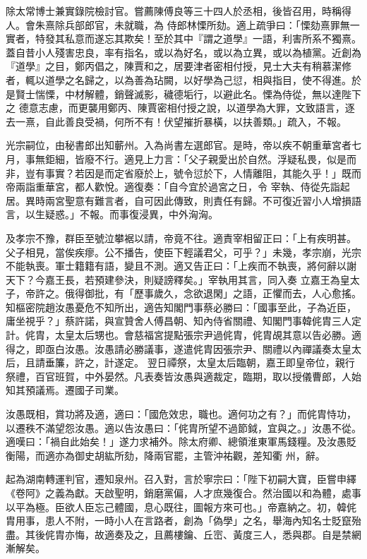 \begin{pinyinscope}
 除太常博士兼實錄院檢討官。嘗薦陳傅良等三十四人於丞相，後皆召用，時稱得人。會朱熹除兵部郎官，未就職，為
 侍郎林慄所劾。適上疏爭曰：「慄劾熹罪無一實者，特發其私意而遂忘其欺矣！至於其中『謂之道學』一語，利害所系不獨熹。蓋自昔小人殘害忠良，率有指名，或以為好名，或以為立異，或以為植黨。近創為『道學』之目，鄭丙倡之，陳賈和之，居要津者密相付授，見士大夫有稍慕潔修者，輒以道學之名歸之，以為善為玷闕，以好學為己愆，相與指目，使不得進。於是賢士惴慄，中材解體，銷聲滅影，穢德垢行，以避此名。慄為侍從，無以達陛下之
 德意志慮，而更襲用鄭丙、陳賈密相付授之說，以道學為大罪，文致語言，逐去一熹，自此善良受禍，何所不有！伏望摧折暴橫，以扶善類。」疏入，不報。



 光宗嗣位，由秘書郎出知蘄州。入為尚書左選郎官。是時，帝以疾不朝重華宮者七月，事無鉅細，皆廢不行。適見上力言：「父子親愛出於自然。浮疑私畏，似是而非，豈有事實？若因是而定省廢於上，號令愆於下，人情離阻，其能久乎！」既而帝兩詣重華宮，都人歡悅。適復奏：「自今宜於過宮之日，令
 宰執、侍從先詣起居。異時兩宮聖意有難言者，自可因此傳致，則責任有歸。不可復近習小人增損語言，以生疑惑。」不報。而事復浸異，中外洶洶。



 及孝宗不豫，群臣至號泣攀裾以請，帝竟不往。適責宰相留正曰：「上有疾明甚。父子相見，當俟疾瘳。公不播告，使臣下輕議君父，可乎？」未幾，孝宗崩，光宗不能執喪。軍士籍籍有語，變且不測。適又告正曰：「上疾而不執喪，將何辭以謝天下？今嘉王長，若預建參決，則疑謗釋矣。」宰執用其言，同入奏
 立嘉王為皇太子，帝許之。俄得御批，有「歷事歲久，念欲退閑」之語，正懼而去，人心愈搖。知樞密院趙汝愚憂危不知所出，適告知閣門事蔡必勝曰：「國事至此，子為近臣，庸坐視乎？」蔡許諾，與宣贊舍人傅昌朝、知內侍省關禮、知閣門事韓侂胄三人定計。侂胄，太皇太后甥也。會慈福宮提點張宗尹過侂胄，侂胄覘其意以告必勝。適得之，即亟白汝愚。汝愚請必勝議事，遂遣侂胄因張宗尹、關禮以內禪議奏太皇太后，且請垂簾，許之，計遂定。
 翌日禫祭，太皇太后臨朝，嘉王即皇帝位，親行祭禮，百官班賀，中外晏然。凡表奏皆汝愚與適裁定，臨期，取以授儀曹郎，人始知其預議焉。遷國子司業。



 汝愚既相，賞功將及適，適曰：「國危效忠，職也。適何功之有？」而侂胄恃功，以遷秩不滿望怨汝愚。適以告汝愚曰：「侂胄所望不過節鉞，宜與之。」汝愚不從。適嘆曰：「禍自此始矣！」遂力求補外。除太府卿、總領淮東軍馬錢糧。及汝愚貶衡陽，而適亦為御史胡紘所劾，降兩官罷，主管沖祐觀，差知衢
 州，辭。



 起為湖南轉運判官，遷知泉州。召入對，言於寧宗曰：「陛下初嗣大寶，臣嘗申繹《卷阿》之義為獻。天啟聖明，銷磨黨偏，人才庶幾復合。然治國以和為體，處事以平為極。臣欲人臣忘己體國，息心既往，圖報方來可也。」帝嘉納之。初，韓侂胄用事，患人不附，一時小人在言路者，創為「偽學」之名，舉海內知名士貶竄殆盡。其後侂胄亦悔，故適奏及之，且薦樓鑰、丘崈、黃度三人，悉與郡。自是禁網漸解矣。




\end{pinyinscope}
